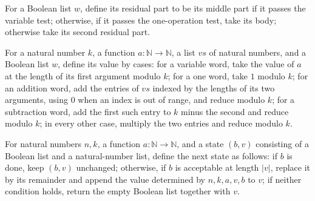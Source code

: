 \begin{definition}
\label{Randomized.PIT.restW}
\leanok
{}
For a Boolean list $w$, define its residual part to be its middle part if it passes the
variable test; otherwise, if it passes the one-operation test, take its body; otherwise
take its second residual part.
\end{definition}

\begin{definition}
\label{Randomized.PIT.valN}
\leanok
{}
For a natural number $k$, a function $a : \mathbb{N} \to \mathbb{N}$, a list
$vs$ of natural numbers, and a Boolean list $w$, define its value by cases: for a
variable word, take the value of $a$ at the length of its first argument modulo $k$; for
a one word, take $1$ modulo $k$; for an addition word, add the entries of $vs$ indexed
by the lengths of its two arguments, using $0$ when an index is out of range, and reduce
modulo $k$; for a subtraction word, add the first such entry to $k$ minus the second and
reduce modulo $k$; in every other case, multiply the two entries and reduce modulo $k$.
\end{definition}

\begin{definition}
\label{Randomized.PIT.wStep}
\leanok
{}
For natural numbers $n,k$, a function $a\colon\mathbb{N}\to\mathbb{N}$, and a state
$(b,v)$ consisting of a Boolean list and a natural-number list, define the next state as
follows: if $b$ is done, keep $(b,v)$ unchanged; otherwise, if $b$ is acceptable at
length $|v|$, replace it by its remainder and append the value determined by $n,k,a,v,b$
to $v$; if neither condition holds, return the empty Boolean list together with $v$.
\end{definition}

